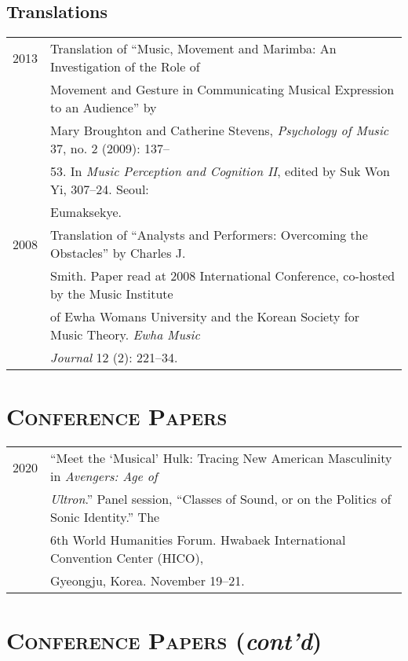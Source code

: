 \documentclass[a4paper,11pt,draft]{article}
\begin{document}
  \subsection*{Translations}
  \hspace*{-0.25cm}
  \begin{tabular}{p{2.5cm} p{12.5cm}}
    2013 & Translation of “Music, Movement and Marimba: An Investigation of the
    Role of\\
    & Movement and Gesture in Communicating Musical Expression to an Audience”
    by\\
    & Mary Broughton and Catherine Stevens, \textit{Psychology of Music} 37,
    no. 2 (2009): 137–\\
    & 53. In \textit{Music Perception and Cognition II}, edited by Suk Won Yi,
    307–24. Seoul:\\
    & Eumaksekye.\\[2mm]
    
    2008 & Translation of “Analysts and Performers: Overcoming the Obstacles”
    by Charles J.\\
    & Smith. Paper read at 2008 International Conference, co-hosted by the
    Music Institute\\
    & of Ewha Womans University and the Korean Society for Music Theory.
    \textit{Ewha Music}\\
    & \textit{Journal} 12 (2): 221–34.
  \end{tabular}
  
  \vspace{5.0mm}
  
  \section*{\textsc{Conference Papers}}
  
  \hspace*{-0.25cm}
  \begin{tabular}{p{2.5cm} p{12.5cm}}
    2020 & “Meet the ‘Musical’ Hulk: Tracing New American Masculinity in \textit{Avengers: Age of}\\
    & \textit{Ultron}.” Panel session, “Classes of Sound, or on the Politics of Sonic Identity.” The\\
    & 6th World Humanities Forum. Hwabaek International Convention Center (HICO),\\
    & Gyeongju, Korea. November 19–21.
  \end{tabular}
  
  \section*{\textsc{Conference Papers} (\textit{cont'd})}
  
\end{document}
